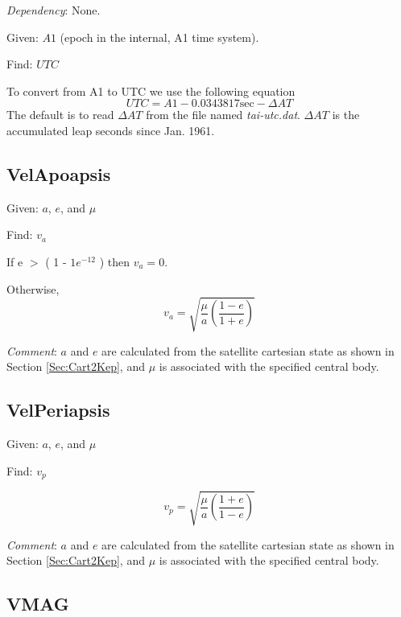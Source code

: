 \noindent \textit{Dependency}:  None.

\noindent Given:  $A1$ (epoch in the internal, A1 time system).

\noindent Find:  $UTC$

To convert from A1 to UTC we use the following equation
%
\begin{equation}
     UTC = A1 - 0.0343817 \mbox{sec} - \Delta AT
\end{equation}
%
The default is to read $\Delta AT$ from the file named
\textit{tai-utc.dat}. $\Delta AT$ is the accumulated leap seconds
since Jan. 1961.


\subsection{VelApoapsis}

Given:  $a$, $e$, and $\mu$

\noindent Find:  $v_a$

\noindent If e $>$ ( 1 - $1e^{-12}$ ) then $v_a = 0$.
%

\noindent Otherwise,
%
\begin{equation}
    v_a = \sqrt{ \frac{\mu}{a} \left(\frac{1-e}{1+e}\right)}
\end{equation}

\noindent \textit{Comment}:  $a$ and $e$ are calculated from the
satellite cartesian state as shown in Section \ref{Sec:Cart2Kep},
and $\mu$ is associated with the specified central body.

\subsection{VelPeriapsis} 

Given:  $a$, $e$, and $\mu$

\noindent Find:  $v_p$

\begin{equation}
    v_p = \sqrt{ \frac{\mu}{a} \left(\frac{1+e}{1-e}\right)}
\end{equation}

\noindent \textit{Comment}:  $a$ and $e$ are calculated from the
satellite cartesian state as shown in Section \ref{Sec:Cart2Kep},
and $\mu$ is associated with the specified central body.

\subsection{VMAG} 

